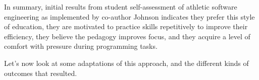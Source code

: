 In summary, initial results from student self-assessment of athletic software engineering as implemented by co-author Johnson indicates they prefer this style of education, they are motivated to practice skills repetitively to improve their efficiency, they believe the pedagogy improves focus, and they acquire a level of comfort with pressure during programming tasks. 

Let's now look at some adaptations of this approach, and the different kinds of outcomes that resulted.





